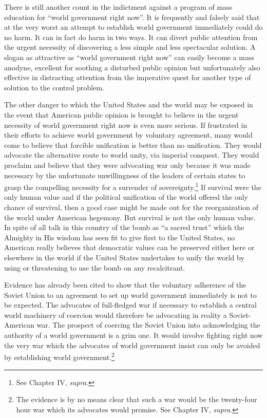 There is still another count in the indictment against a program of mass education for ``world government right now''. It is frequently and falsely said that at the very worst an attempt to establish world government immediately could do no harm. It can in fact do harm in two ways. It can divert public attention from the urgent necessity of discovering a less simple and less spectacular solution. A slogan as attractive as ``world government right now'' can easily become a mass anodyne, excellent for soothing a disturbed public opinion but unfortunately also effective in distracting attention from the imperative quest for another type of solution to the control problem.

The other danger to which the United States and the world may be exposed in the event that American public opinion is brought to believe in the urgent necessity of world government right now is even more serious. If frustrated in their efforts to achieve world government by voluntary agreement, many would come to believe that forcible unification is better than no unification. They would advocate the alternative route to world unity, via imperial conquest. They would proclaim and believe that they were advocating war only because it was made necessary by the unfortunate unwillingness of the leaders of certain states to grasp the compelling necessity for a surrender of sovereignty.\footnote{See Chapter IV, \textit{supra}.} If survival were the only human value and if the political unification of the world offered the only chance of survival, then a good case might be made out for the reorganization of the world under American hegemony. But survival is not the only human value. In spite of all talk in this country of the bomb as ``a sacred trust'' which the Almighty in His wisdom has seen fit to give first to the United States, no American really believes that democratic values can be preserved either here or elsewhere in the world if the United States undertakes to unify the world by using or threatening to use the bomb on any recalcitrant.

Evidence has already been cited to show that the voluntary adherence of the Soviet Union to an agreement to set up world government immediately is not to be expected. The advocates of full-fledged war if necessary to establish a central world machinery of coercion would therefore be advocating in reality a Soviet-American war. The prospect of coercing the Soviet Union into acknowledging the authority of a world government is a grim one. It would involve fighting right now the very war which the advocates of world government insist can only be avoided by establishing world government.\footnote{The evidence is by no means clear that such a war would be the twenty-four hour war which its advocates would promise. See Chapter IV, \textit{supra}.}

